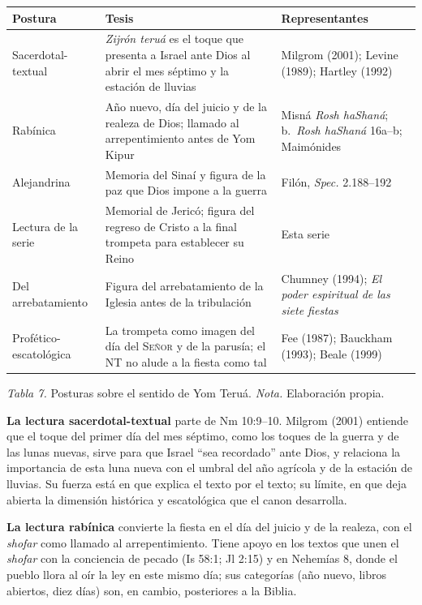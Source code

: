 \documentclass[11pt,letterpaper]{article}
\newcommand{\SENOR}{\textsc{Señor}}
\begin{document}
\begin{center}\begin{minipage}{\linewidth}\centering\small\renewcommand{\arraystretch}{1.18}
\begin{tabular}{@{}L{3.1cm}L{6.0cm}L{5.3cm}@{}}
\toprule
\textbf{Postura} & \textbf{Tesis} & \textbf{Representantes} \\ \midrule
Sacerdotal-textual & \emph{Zijrón teruá} es el toque que presenta a Israel ante Dios al abrir el mes séptimo y la estación de lluvias & Milgrom (2001); Levine (1989); Hartley (1992) \\
Rabínica & Año nuevo, día del juicio y de la realeza de Dios; llamado al arrepentimiento antes de Yom Kipur & Misná \emph{Rosh haShaná}; b.~\emph{Rosh haShaná} 16a--b; Maimónides \\
Alejandrina & Memoria del Sinaí y figura de la paz que Dios impone a la guerra & Filón, \emph{Spec.} 2.188--192 \\
Lectura de la serie & Memorial de Jericó; figura del regreso de Cristo a la final trompeta para establecer su Reino & Esta serie \\
Del arrebatamiento & Figura del arrebatamiento de la Iglesia antes de la tribulación & Chumney (1994); \emph{El poder espiritual de las siete fiestas} \\
Profético-escatológica & La trompeta como imagen del día del \SENOR{} y de la parusía; el NT no alude a la fiesta como tal & Fee (1987); Bauckham (1993); Beale (1999) \\
\bottomrule
\end{tabular}\par
{\footnotesize\color{sepia}\textit{Tabla 7.} Posturas sobre el sentido de Yom Teruá. \textit{Nota.} Elaboración propia.}
\end{minipage}\end{center}

\textbf{La lectura sacerdotal-textual} parte de Nm 10:9--10. Milgrom (2001) entiende que el toque del primer día del mes séptimo, como los toques de la guerra y de las lunas nuevas, sirve para que Israel ``sea recordado'' ante Dios, y relaciona la importancia de esta luna nueva con el umbral del año agrícola y de la estación de lluvias. Su fuerza está en que explica el texto por el texto; su límite, en que deja abierta la dimensión histórica y escatológica que el canon desarrolla.

\textbf{La lectura rabínica} convierte la fiesta en el día del juicio y de la realeza, con el \emph{shofar} como llamado al arrepentimiento. Tiene apoyo en los textos que unen el \emph{shofar} con la conciencia de pecado (Is 58:1; Jl 2:15) y en Nehemías 8, donde el pueblo llora al oír la ley en este mismo día; sus categorías (año nuevo, libros abiertos, diez días) son, en cambio, posteriores a la Biblia.
\end{document}
